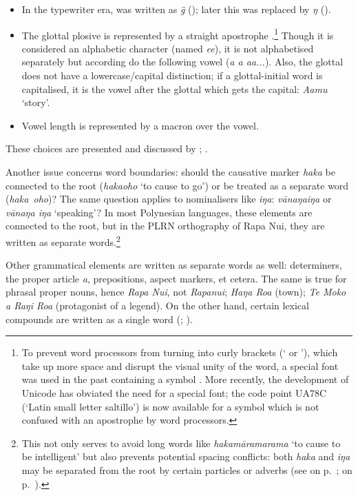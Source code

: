 \begin{itemize}
\item 
In the typewriter era,  was written as \textit{\"{g}} (\citealt{WeberWeber1985}); later this was replaced by \textit{ŋ} (\citealt{WeberWeber2005}). 

\item 
The glottal plosive is represented by a straight apostrophe {\ꞌ}.\footnote{\label{fn:21}To prevent word processors from turning {\ꞌ} into curly brackets (‘ or ’), which take up more space and disrupt the visual unity of the word, a special font was used in the past containing a symbol {\ꞌ}. More recently, the development of Unicode has obviated the need for a special font; the code point UA78C (‘Latin small letter saltillo’) is now available for a symbol \textit{\textup{{\ꞌ}}} which is not confused with an apostrophe by word processors.} Though it is considered an alphabetic character (named \textit{e{\ꞌ}e}), it is not alphabetised separately but according do the following vowel (\textit{a {\ꞌ}a a{\ꞌ}a...}). Also, the glottal does not have a lowercase/capital distinction; if a glottal-initial word is capitalised, it is the vowel after the glottal which gets the capital: \textit{\mbox{{\ꞌ}A{\ꞌ}amu}} ‘story’.

\item 
Vowel length is represented by a macron over the vowel. 

\end{itemize}

These choices are presented and discussed by \citet{WeberWeber1985}; \citet{WeberWeber2005}. 

Another issue concerns word boundaries: should the causative marker \textit{haka} be connected to the root (\textit{hakaoho} ‘to cause to go’) or be treated as a separate word (\textit{haka~oho})? The same question applies to nominalisers like \textit{iŋa}: \textit{vānaŋaiŋa} or \textit{vānaŋa iŋa} ‘speaking’? In most Polynesian languages, these elements are connected to the root, but in the PLRN orthography of Rapa Nui, they are written as separate words.\footnote{\label{fn:22}This not only serves to avoid long words like \textit{hakamāramarama} ‘to cause to be intelligent’ but also prevents potential spacing conflicts: both \textit{haka} and \textit{iŋa} may be separated from the root by certain particles or adverbs (see  on p.~\pageref{ex:3.52};  on p.~\pageref{ex:7.99}).} 

Other grammatical elements are written as separate words as well: determiners, the proper article \textit{a}, prepositions, aspect markers, et cetera. The same is true for phrasal proper nouns, hence \textit{Rapa Nui}, not \textit{Rapanui}; \textit{Haŋa Roa} (town); \textit{Te Moko {\ꞌ}a Raŋi Roa} (protagonist of a legend). On the other hand, certain lexical compounds are written as a single word (; \citealt[27]{WeberWeber1985}). 

